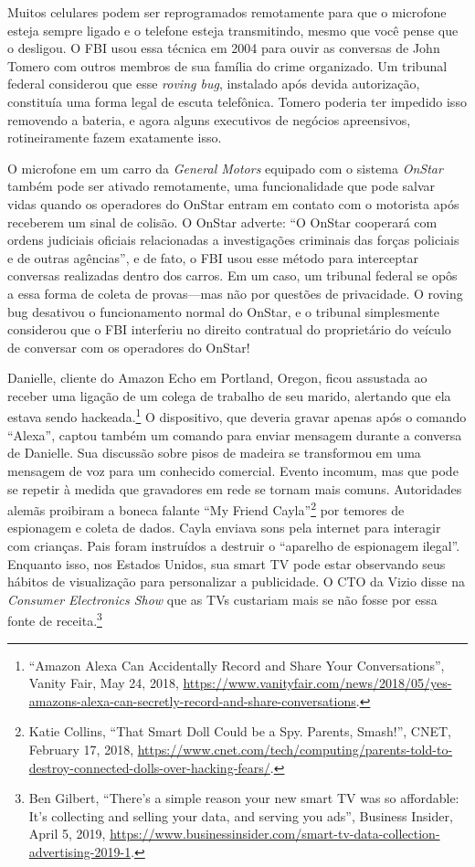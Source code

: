 \documentclass{book}
\newcommand{\ingles}[1]{\textit{#1}}
\begin{document}
Muitos celulares podem ser reprogramados remotamente para que o microfone esteja
sempre ligado e o telefone esteja transmitindo, mesmo que você pense que o
desligou. O FBI usou essa técnica em 2004 para ouvir as conversas de John Tomero
com outros membros de sua família do crime organizado. Um tribunal federal
considerou que esse \ingles{roving bug}, instalado após devida autorização,
constituía uma forma legal de escuta telefônica. Tomero poderia ter impedido
isso removendo a bateria, e agora alguns executivos de negócios apreensivos,
rotineiramente fazem exatamente isso.

O microfone em um carro da \ingles{General Motors} equipado com o sistema
\ingles{OnStar} também pode ser ativado remotamente, uma funcionalidade que pode
salvar vidas quando os operadores do OnStar entram em contato com o motorista
após receberem um sinal de colisão. O OnStar adverte: ``O OnStar cooperará com
ordens judiciais oficiais relacionadas a investigações criminais das forças
policiais e de outras agências'', e de fato, o FBI usou esse método para
interceptar conversas realizadas dentro dos carros. Em um caso, um tribunal
federal se opôs a essa forma de coleta de provas---mas não por questões de
privacidade. O roving bug desativou o funcionamento normal do OnStar, e
o tribunal simplesmente considerou que o FBI interferiu no direito contratual
do proprietário do veículo de conversar com os operadores do OnStar!

Danielle, cliente do Amazon Echo em Portland, Oregon, ficou assustada ao receber
uma ligação de um colega de trabalho de seu marido, alertando que ela estava
sendo hackeada.\footnote{``Amazon Alexa Can Accidentally Record and Share Your
Conversations'', Vanity Fair, May 24, 2018,
\url{https://www.vanityfair.com/news/2018/05/yes-amazons-alexa-can-secretly-record-and-share-conversations}.}
O dispositivo, que deveria gravar apenas após o comando ``Alexa'',
captou também um comando para enviar mensagem durante a conversa de Danielle.
Sua discussão sobre pisos de madeira se transformou em uma mensagem de voz para
um conhecido comercial. Evento incomum, mas que pode se repetir à medida que
gravadores em rede se tornam mais comuns. Autoridades alemãs proibiram a boneca
falante ``My Friend Cayla''\footnote{Katie Collins, ``That Smart Doll Could
be a Spy. Parents, Smash!'', CNET, February 17, 2018,
\url{https://www.cnet.com/tech/computing/parents-told-to-destroy-connected-dolls-over-hacking-fears/}.}
por temores de espionagem e coleta de dados. Cayla
enviava sons pela internet para interagir com crianças. Pais foram instruídos
a destruir o ``aparelho de espionagem ilegal''. Enquanto isso, nos Estados
Unidos, sua smart TV pode estar observando seus hábitos de visualização para
personalizar a publicidade. O CTO da Vizio disse na \ingles{Consumer Electronics
Show} que as TVs custariam mais se não fosse por essa fonte de receita.\footnote{
Ben Gilbert, ``There’s a simple reason your new smart TV was so affordable:
It’s collecting and selling your data, and serving you ads'', Business Insider,
April 5, 2019,
\url{https://www.businessinsider.com/smart-tv-data-collection-advertising-2019-1}.}
\end{document}
